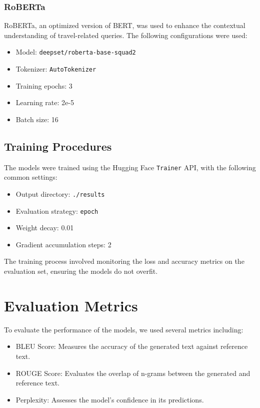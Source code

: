 \documentclass[conference]{IEEEtran}
\begin{document}
\subsubsection{RoBERTa}

RoBERTa, an optimized version of BERT, was used to enhance the contextual understanding of travel-related queries. The following configurations were used:
\begin{itemize}
    \item Model: \texttt{deepset/roberta-base-squad2}
    \item Tokenizer: \texttt{AutoTokenizer}
    \item Training epochs: 3
    \item Learning rate: 2e-5
    \item Batch size: 16
\end{itemize}

\subsection{Training Procedures}

The models were trained using the Hugging Face \texttt{Trainer} API, with the following common settings:
\begin{itemize}
    \item Output directory: \texttt{./results}
    \item Evaluation strategy: \texttt{epoch}
    \item Weight decay: 0.01
    \item Gradient accumulation steps: 2
\end{itemize}

The training process involved monitoring the loss and accuracy metrics on the evaluation set, ensuring the models do not overfit.

\section{Evaluation Metrics}

To evaluate the performance of the models, we used several metrics including:
\begin{itemize}
    \item BLEU Score: Measures the accuracy of the generated text against reference text.
    \item ROUGE Score: Evaluates the overlap of n-grams between the generated and reference text.
    \item Perplexity: Assesses the model's confidence in its predictions.
\end{itemize}
\end{document}
